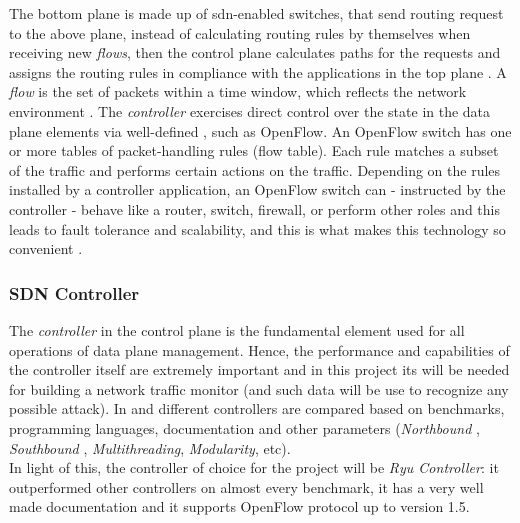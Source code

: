 \noindent The bottom plane is made up of \gls{sdn}-enabled switches, that send routing request to the above plane, instead of calculating routing rules by themselves when receiving new \textit{flows}, then the control plane calculates paths for the requests and assigns the routing rules in compliance with the applications in the top plane \cite{Xu2017}. A \textit{flow} is the set of packets within a time window, which reflects the network environment \cite{Liu2019}. The \textit{controller} exercises direct control over the state in the data plane elements via well-defined , such as OpenFlow. An OpenFlow switch has one or more tables of packet-handling rules (flow table). Each rule matches a subset of the traffic and performs certain actions on the traffic. Depending on the rules installed by a controller application, an OpenFlow switch can - instructed by the controller - behave like a router, switch, firewall, or perform other roles and this leads to fault tolerance and scalability, and this is what makes this technology so convenient \cite{Lantz2015}.


\subsubsection{SDN Controller}
\label{subsubsec:sdn-controller}

The \textit{controller} in the control plane is the fundamental element used for all operations of data plane management. Hence, the performance and capabilities of the controller itself are extremely important and in this project its  will be needed for building a network traffic monitor (and such data will be use to recognize any possible attack). In \cite{Bondkovskii2016} and \cite{Zhu2019} different controllers are compared based on benchmarks, programming languages, documentation and other parameters (\textit{Northbound }, \textit{Southbound }, \textit{Multithreading}, \textit{Modularity}, etc). \\ In light of this, the controller of choice for the project will be \textit{Ryu Controller}: it outperformed other controllers on almost every benchmark, it has a very well made documentation \cite{RyuDoc} and it supports OpenFlow protocol up to version 1.5.

